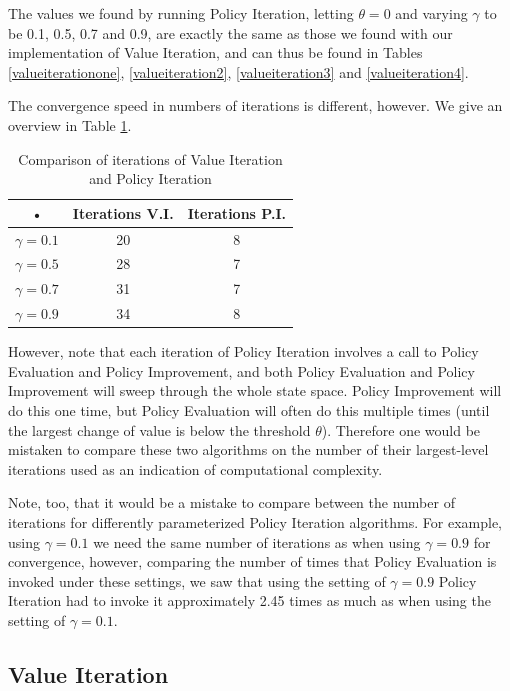 \documentclass{article}
\begin{document}
The values we found by running Policy Iteration, letting $\theta = 0$ and varying $\gamma$ to be 0.1, 0.5, 0.7 and 0.9, are exactly the same as those we found with our implementation of Value Iteration, and can thus be found in Tables \ref{valueiterationone}, \ref{valueiteration2}, \ref{valueiteration3} and \ref{valueiteration4}.

The convergence speed in numbers of iterations is different, however. We give an overview in Table \ref{tab:policyEvaluationValues}.

\begin{table}[htb]
\centering
\begin{tabular}{|c|c|c|}
\hline 
• & Iterations V.I. & Iterations P.I. \\ 
\hline 
$\gamma = 0.1 $ & 20 & 8 \\ 
\hline 
$\gamma = 0.5 $ & 28 & 7 \\ 
\hline 
$\gamma = 0.7 $  & 31 & 7 \\ 
\hline 
$\gamma = 0.9 $ & 34 & 8 \\ 
\hline 
\end{tabular}
\caption{Comparison of iterations of Value Iteration and Policy Iteration}
\label{tab:policyEvaluationValues} 
\end{table}

However, note that each iteration of Policy Iteration involves a call to Policy Evaluation and Policy Improvement, and both Policy Evaluation and Policy Improvement will sweep through the whole state space. Policy Improvement will do this one time, but Policy Evaluation will often do this multiple times (until the largest change of value is below the threshold $\theta$). Therefore one would be mistaken to compare these two algorithms on the number of their largest-level iterations used as an indication of computational complexity. 

Note, too, that it would be a mistake to compare between the number of iterations for differently parameterized Policy Iteration algorithms. For example, using  $\gamma = 0.1 $ we need the same number of iterations as when using $\gamma = 0.9 $  for convergence, however, comparing the number of times that Policy Evaluation is invoked under these settings, we saw that using the setting of $\gamma = 0.9 $ Policy Iteration had to invoke it approximately 2.45 times as much as when using the setting of $\gamma = 0.1 $. 

\subsection{Value Iteration}
\end{document}
